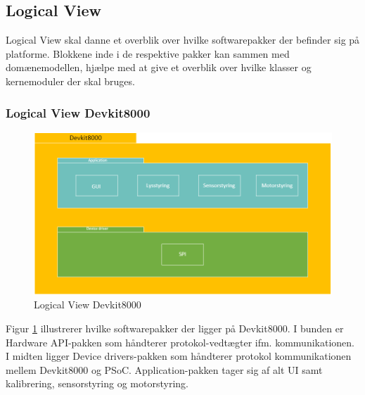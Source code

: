 \subsection{Logical View}
Logical View skal danne et overblik over hvilke softwarepakker der befinder sig på platforme. Blokkene inde i de respektive pakker kan sammen med domænemodellen, hjælpe med at give et overblik over hvilke klasser og kernemoduler der skal bruges.
\subsubsection{Logical View Devkit8000}
\begin{figure}[H] \centering
    \includegraphics[width=\textwidth]{0_Filer/Figuer/LogicalViewDevkit8000.png}
    \caption{Logical View Devkit8000}
    \label{fig:LogicalView}
\end{figure}
Figur \ref{fig:LogicalView} illustrerer hvilke softwarepakker der ligger på Devkit8000. I bunden er Hardware API-pakken som håndterer protokol-vedtægter ifm. kommunikationen. I midten ligger Device drivers-pakken som håndterer protokol kommunikationen mellem Devkit8000 og PSoC. Application-pakken tager sig af alt UI samt kalibrering, sensorstyring og motorstyring.

